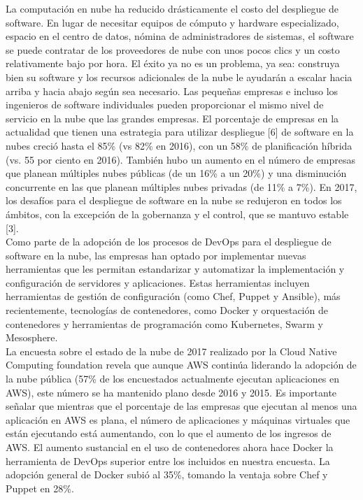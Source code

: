 \begin{multicols}{2}
La computación en nube ha reducido drásticamente el costo del despliegue de software. En lugar de necesitar equipos de cómputo y hardware especializado, espacio en el centro de datos,  nómina de administradores de sistemas, el software se puede contratar de los proveedores de nube con unos pocos clics y un costo relativamente bajo por hora. El éxito ya no es un problema, ya sea: construya bien su software y los recursos adicionales de la nube le ayudarán a escalar hacia arriba y hacia abajo según sea necesario. Las pequeñas empresas e incluso los ingenieros de software individuales pueden proporcionar el mismo nivel de servicio en la nube que las grandes empresas.
El porcentaje de empresas en la actualidad que tienen una estrategia para utilizar despliegue [6] de software en la nubes creció hasta el 85\% (vs 82\% en 2016), con un 58\% de planificación híbrida (vs. 55 por ciento en 2016). También hubo un aumento en el número de empresas que planean múltiples nubes públicas (de un 16\% a un 20\%) y una disminución concurrente en las que planean múltiples nubes privadas (de 11\% a 7\%). En 2017, los desafíos para el despliegue de software en la nube se redujeron en todos los ámbitos, con la excepción de la gobernanza y el control, que se mantuvo estable [3].\\

Como parte de la adopción de los procesos de DevOps para el despliegue de software en la nube, las empresas han optado por implementar nuevas herramientas que les permitan estandarizar y automatizar la implementación y configuración de servidores y aplicaciones. Estas herramientas incluyen herramientas de gestión de configuración (como Chef, Puppet y Ansible),  más recientemente, tecnologías de contenedores, como Docker y orquestación de contenedores y herramientas de programación como Kubernetes, Swarm y Mesosphere.\\

La encuesta sobre el estado de la nube de 2017 realizado por la Cloud Native Computing foundation revela que aunque AWS continúa liderando la adopción de la nube pública (57\% de los encuestados actualmente ejecutan aplicaciones en AWS), este número se ha mantenido plano desde 2016 y 2015. Es importante señalar que mientras que el porcentaje de las empresas que ejecutan al menos una aplicación en AWS es plana, el número de aplicaciones y máquinas virtuales que están ejecutando está aumentando, con lo que el aumento de los ingresos de AWS. El aumento sustancial en el uso de contenedores ahora hace Docker la herramienta de DevOps superior entre los incluidos en nuestra encuesta. La adopción general de Docker subió al 35\%, tomando la ventaja sobre Chef y Puppet en 28\%.\\


\end{multicols}
